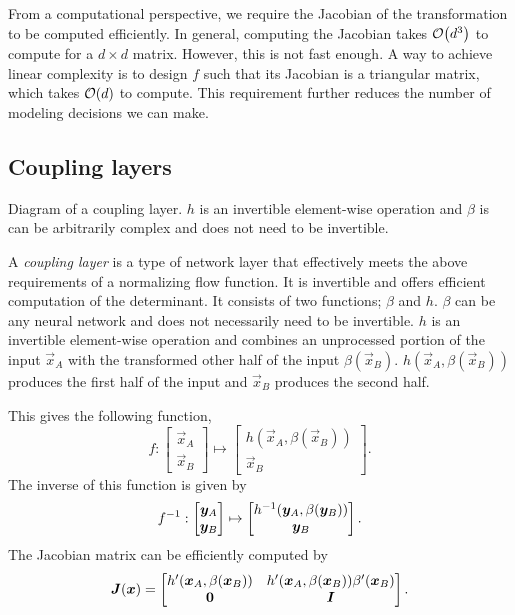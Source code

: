 From a computational perspective, we require the Jacobian of the transformation to be computed
efficiently. In general, computing the Jacobian takes $\bigo{d^3}$ to compute for a $d \times d$
matrix. However, this is not fast enough. A way to achieve linear complexity is to design $f$ such
that its Jacobian is a triangular matrix, which takes $\bigo{d}$ to compute. This requirement
further reduces the number of modeling decisions we can make.

\subsection{Coupling layers}

\begin{marginfigure}
    \centering
    \caption{Diagram of a coupling layer. $h$ is an invertible element-wise operation and $\beta$ is
        can be arbitrarily complex and does not need to be invertible.}
    \label{fig:coupling-layer}
\end{marginfigure}

A \textit{coupling layer} is a type of network layer that effectively meets the above requirements
of a normalizing flow function. It is invertible and offers efficient computation of the
determinant. It consists of two functions; $\beta$ and $h$. $\beta$ can be any neural network and
does not necessarily need to be invertible. $h$ is an invertible element-wise operation and combines an unprocessed portion of the
input $\vec{x}_A$ with the transformed other half of the input $\beta(\vec{x}_B)$. $h(\vec{x}_A,
    \beta(\vec{x}_B))$ produces the first half of the input and $\vec{x}_B$ produces the second half.

This gives the following function, \[
    f: \begin{bmatrix} \vec{x}_A \\ \vec{x}_B \end{bmatrix} \mapsto \begin{bmatrix} h(\vec{x}_A, \beta(\vec{x}_B)) \\ \vec{x}_B \end{bmatrix}.
\]
The inverse of this function is given by \[
    f^{-1}: \begin{bmatrix} \bm{y}_A \\ \bm{y}_B \end{bmatrix} \mapsto \begin{bmatrix} h^{-1}(\bm{y}_A, \beta(\bm{y}_B)) \\ \bm{y}_B \end{bmatrix}.
\]
The Jacobian matrix can be efficiently computed by \[
    \bm{J}(\bm{x}) = \begin{bmatrix}
        h'(\bm{x}_A, \beta(\bm{x}_B)) & h'(\bm{x}_A, \beta(\bm{x}_B)) \beta'(\bm{x}_B) \\
        \bm{0}                         & \bm{I}
    \end{bmatrix}.
\]

